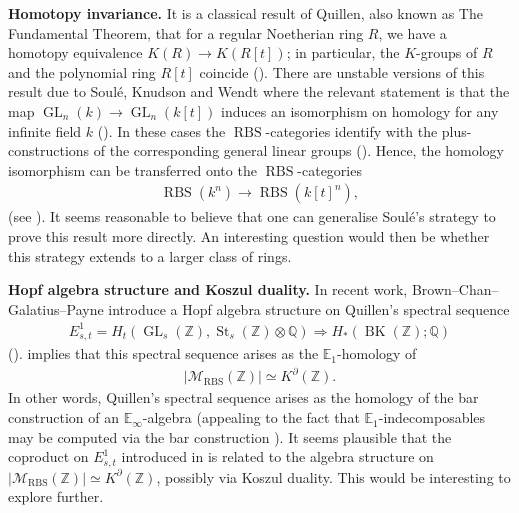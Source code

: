 \documentclass[12pt, reqno]{amsart}
\theoremstyle{plain}
\theoremstyle{definition}
\newcommand{\Z}{\mathbb Z}
\newcommand{\Q}{\mathbb Q}
\begin{document}
\textbf{Homotopy invariance.} It is a classical result of Quillen, also known as The Fundamental Theorem, that for a regular Noetherian ring $R$, we have a homotopy equivalence $K(R) \rightarrow K(R[t])$; in particular, the $K$-groups of $R$ and the polynomial ring $R[t]$ coincide (\cite{Quillen73}). There are unstable versions of this result due to Soulé, Knudson and Wendt where the relevant statement is that the map $\operatorname{GL}_n(k) \rightarrow  \operatorname{GL}_n(k[t])$ induces an isomorphism on homology for any infinite field $k$ (\cite{Soule,Knudson97,Wendt}). In these cases the $\operatorname{RBS}$-categories identify with the plus-constructions of the corresponding general linear groups (\cite[Theorem 1.3]{ClausenOrsnesJansen}). Hence, the homology isomorphism can be transferred onto the $\operatorname{RBS}$-categories 
\begin{align*}
\operatorname{RBS}(k^n)\rightarrow \operatorname{RBS}(k[t]^n),
\end{align*}
(see \cite[Corollary 5.3.3]{Damia}). It seems reasonable to believe that one can generalise Soulé's strategy to prove this result more directly. An interesting question would then be whether this strategy extends to a larger class of rings.

\medskip

\textbf{Hopf algebra structure and Koszul duality.} In recent work, Brown--Chan--Galatius--Payne introduce a Hopf algebra structure on Quillen's spectral sequence
\begin{align*}
E^1_{s,t} = H_t(\operatorname{GL}_s(\Z), \operatorname{St}_s(\Z)\otimes \Q) \Rightarrow H_*(\operatorname{BK}(\Z);\Q)
\end{align*}
(\cite{BrownChanGalatiusPayne}).  implies that this spectral sequence arises as the $\mathbb{E}_1$-homology of
\begin{align*}
|\mathscr{M}_{\operatorname{RBS}}(\Z)|\simeq K^\partial(\Z).
\end{align*}
In other words, Quillen's spectral sequence arises as the homology of the bar construction of an $\mathbb{E}_\infty$-algebra (appealing to the fact that $\mathbb{E}_1$-indecomposables may be computed via the bar construction \cite[\S 13]{GalatiusKupersRandalWilliams}). It seems plausible that the coproduct on $E^1_{s,t}$ introduced in \cite{BrownChanGalatiusPayne} is related to the algebra structure on $|\mathscr{M}_{\operatorname{RBS}}(\Z)|\simeq K^\partial(\Z)$, possibly via Koszul duality. This would be interesting to explore further.
\end{document}
